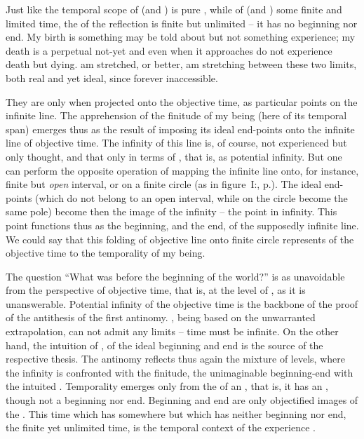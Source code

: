 Just like the temporal scope of  (and ) is pure
, while of  (and ) some finite and limited
time, the  of the reflection  is finite but unlimited -- it
has no  beginning nor end. My birth is something  may be told
about but not something  experience; my death is a perpetual not-yet and
even when it approaches  do not experience death but dying. 
  am stretched, or better, 
am stretching  between these two limits, both real and yet ideal,
since forever inaccessible.

They are  only when projected onto the objective time, as particular
points on the infinite line.  The apprehension of the finitude of my being (here
of its temporal span) emerges thus as the result of imposing its ideal
end-points onto the infinite line of objective time.  The infinity of this line
is, of course, not experienced but only thought, and that only in terms of
, that is, as potential infinity. 
But one can perform the opposite operation of mapping the infinite line onto, for
instance, finite but {\em open} interval, or on a finite circle (as in
figure~I:, p.\pageref{fi:stages}).  The ideal end-points (which do
not belong to an open interval, while on the circle become the same pole) become
then the image of the infinity -- the point in infinity. This point functions
thus as the beginning, and the end, of the supposedly infinite line. We could
say that this folding of objective line onto finite circle represents
 of the objective time to the temporality of my being.


The question ``What was before the beginning of the world?'' is as unavoidable
from the perspective of objective time, that is, at the level of ,
as it is unanswerable.  Potential infinity of the objective time is the backbone
of the proof of the antithesis of the first antinomy. , being based on the unwarranted extrapolation, can not admit any
limits -- time must be infinite. On the other hand, the intuition of
, of the ideal 
 beginning and end is the source of the respective thesis.
The antinomy reflects thus again the mixture of levels, where the
 infinity is confronted with the  finitude,
the unimaginable beginning-end with the intuited . 
Temporality emerges only from the  of an , that is,
it has an , though not a beginning nor end. Beginning and end are
only {objectified} images of the .
This time which has  somewhere but which has neither beginning
nor end, the finite yet unlimited time, is the temporal context of the
experience .

